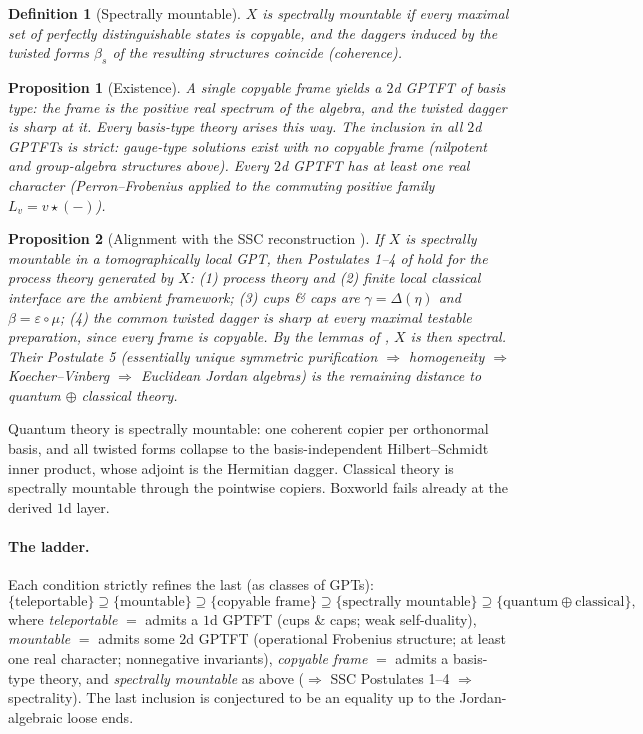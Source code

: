 \documentclass[prl,aps,10pt,superscriptaddress,floatfix]{revtex4-2}
\newtheorem{prop}{Proposition}
\newtheorem*{defi}{Definition}
\begin{document}
\begin{defi}[Spectrally mountable]
$X$ is \emph{spectrally mountable} if \emph{every} maximal set of perfectly distinguishable states is copyable, and the daggers induced by the twisted forms $\beta_s$ of the resulting structures coincide (\emph{coherence}).
\end{defi}

\begin{prop}[Existence]\label{prop:exist}
A single copyable frame yields a $2$d GPTFT of \emph{basis type}: the frame is the positive real spectrum of the algebra, and the twisted dagger is sharp at it. Every basis-type theory arises this way. The inclusion in all $2$d GPTFTs is strict: \emph{gauge-type} solutions exist with no copyable frame (nilpotent and group-algebra structures above). Every $2$d GPTFT has at least one real character (Perron--Frobenius applied to the commuting positive family $L_v=v\star(-)$).
\end{prop}

\begin{prop}[Alignment with the SSC reconstruction \cite{SSC2021}]\label{prop:ssc}
If $X$ is spectrally mountable in a tomographically local GPT, then Postulates 1--4 of \cite{SSC2021} hold for the process theory generated by $X$: \emph{(1)} process theory and \emph{(2)} finite local classical interface are the ambient framework; \emph{(3)} cups \& caps are $\gamma=\Delta(\eta)$ and $\beta=\varepsilon\circ\mu$; \emph{(4)} the common twisted dagger is sharp at every maximal testable preparation, since every frame is copyable. By the lemmas of \cite{SSC2021}, $X$ is then \emph{spectral}. Their Postulate 5 (essentially unique symmetric purification $\Rightarrow$ homogeneity $\Rightarrow$ Koecher--Vinberg $\Rightarrow$ Euclidean Jordan algebras) is the remaining distance to quantum $\oplus$ classical theory.
\end{prop}

Quantum theory is spectrally mountable: one coherent copier per orthonormal basis, and all twisted forms collapse to the basis-independent Hilbert--Schmidt inner product, whose adjoint is the Hermitian dagger. Classical theory is spectrally mountable through the pointwise copiers. Boxworld fails already at the derived $1$d layer.

\paragraph{The ladder.}
Each condition strictly refines the last (as classes of GPTs):
\[
\{\text{teleportable}\}\supseteq\{\text{mountable}\}\supseteq\{\text{copyable frame}\}\supseteq\{\text{spectrally mountable}\}\supseteq\{\text{quantum}\oplus\text{classical}\},
\]
where \emph{teleportable} $=$ admits a $1$d GPTFT (cups \& caps; weak self-duality), \emph{mountable} $=$ admits some $2$d GPTFT (operational Frobenius structure; at least one real character; nonnegative invariants), \emph{copyable frame} $=$ admits a basis-type theory, and \emph{spectrally mountable} as above ($\Rightarrow$ SSC Postulates 1--4 $\Rightarrow$ spectrality). The last inclusion is conjectured to be an equality up to the Jordan-algebraic loose ends.
\end{document}
